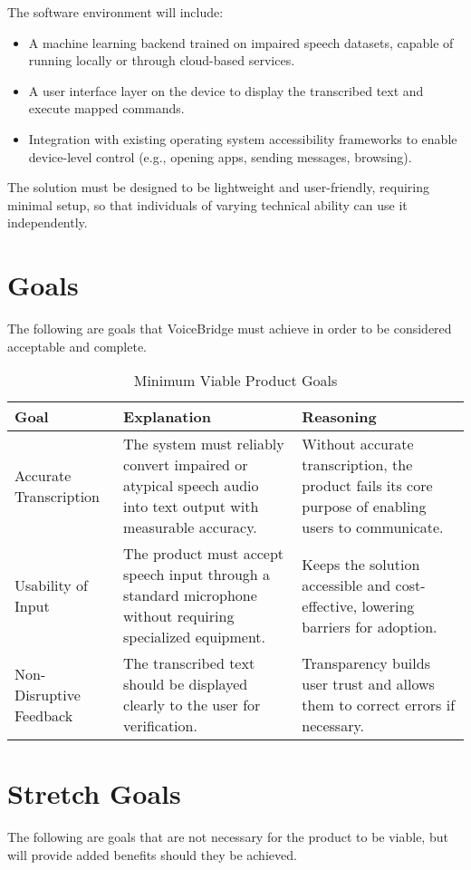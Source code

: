 \documentclass{article}
\begin{document}
The software environment will include:
\begin{itemize}
  \item A machine learning backend trained on impaired speech datasets, capable of running locally or through cloud-based services.
  \item A user interface layer on the device to display the transcribed text and execute mapped commands.
  \item Integration with existing operating system accessibility frameworks to enable device-level control (e.g., opening apps, sending messages, browsing).
\end{itemize}

The solution must be designed to be lightweight and user-friendly, requiring minimal setup, so that individuals of varying technical ability can use it independently.


\section{Goals}
The following are goals that VoiceBridge must achieve in order to be considered acceptable and complete.

\begin{table}[hp]
\caption{Minimum Viable Product Goals}
\begin{tabularx}{\textwidth}{lXX}
\toprule
\textbf{Goal} & \textbf{Explanation} & \textbf{Reasoning}\\
\midrule
Accurate Transcription & The system must reliably convert impaired or atypical speech audio into text output with measurable accuracy. & Without accurate transcription, the product fails its core purpose of enabling users to communicate.\\
Usability of Input & The product must accept speech input through a standard microphone without requiring specialized equipment. & Keeps the solution accessible and cost-effective, lowering barriers for adoption.\\
Non-Disruptive Feedback & The transcribed text should be displayed clearly to the user for verification. & Transparency builds user trust and allows them to correct errors if necessary.\\
\bottomrule
\end{tabularx}
\end{table}

\section{Stretch Goals}
The following are goals that are not necessary for the product to be viable, but will provide added benefits should they be achieved.
\end{document}

